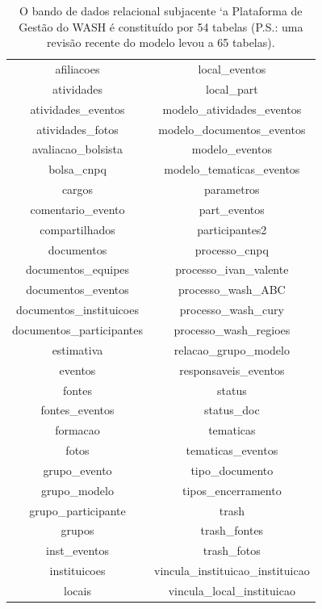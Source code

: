 \documentclass[
12pt,		%
openright,	%
twoside,  %
a4paper,			%
chapter=TITLE,		%
english,			%
french,				%
spanish,			%
brazil				%
]{USPSC-classe/USPSC}
\begin{document}
\begin{table}[htb]
\tiny
\caption{\label{5b2e4ba8f3836249e7dd88b37344da7bfa3669c5}O bando de dados relacional subjacente `a Plataforma de Gest\~ao do WASH \'e constitu\'{i}do por 54 tabelas (P.S.: uma revis\~ao recente do modelo levou a 65 tabelas).}

\centering
\begin{tabular}{|c|c|}
\hline
afiliacoes                     &   local\_eventos \\
 atividades                     &   local\_part \\
 atividades\_eventos             &   modelo\_atividades\_eventos \\
 atividades\_fotos               &   modelo\_documentos\_eventos \\
 avaliacao\_bolsista             &   modelo\_eventos \\
 bolsa\_cnpq                     &   modelo\_tematicas\_eventos \\
 cargos                         &   parametros \\
 comentario\_evento              &   part\_eventos \\
 compartilhados                 &   participantes2 \\
 documentos                     &   processo\_cnpq \\
 documentos\_equipes             &   processo\_ivan\_valente \\
 documentos\_eventos             &   processo\_wash\_ABC \\
 documentos\_instituicoes        &   processo\_wash\_cury \\
 documentos\_participantes       &   processo\_wash\_regioes \\
 estimativa                     &   relacao\_grupo\_modelo \\
 eventos                        &   responsaveis\_eventos \\
 fontes                         &   status \\
 fontes\_eventos                 &   status\_doc \\
 formacao                       &   tematicas \\
 fotos                          &   tematicas\_eventos \\
 grupo\_evento                   &   tipo\_documento \\
 grupo\_modelo                   &   tipos\_encerramento \\
 grupo\_participante             &   trash \\
 grupos                         &   trash\_fontes \\
 inst\_eventos                   &   trash\_fotos \\
 instituicoes                   &   vincula\_instituicao\_instituicao \\
 locais                         &   vincula\_local\_instituicao \\
\hline
\end{tabular}
\end{table}
\end{document}
